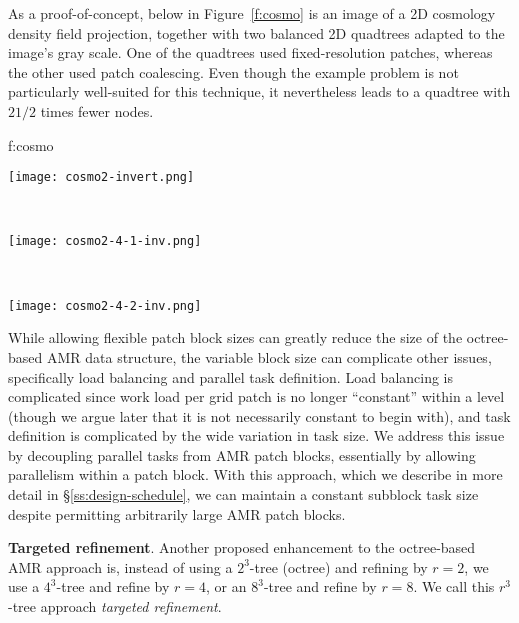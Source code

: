 \documentclass[10pt]{article}
\begin{document}
As a proof-of-concept, below in Figure~\ref{f:cosmo} is an image of a
2D cosmology density field projection, together with two balanced 2D
quadtrees adapted to the image's gray scale.  One of the quadtrees
used fixed-resolution patches, whereas the other used patch
coalescing.  Even though the example problem is not particularly
well-suited for this technique, it nevertheless leads to a quadtree
with $2 1/2$ times fewer nodes.

 {f:cosmo}{
\begin{minipage}{7.0in}
\begin{minipage}{2.2in}
\texttt{[image: cosmo2-invert.png]}
\end{minipage} \ 
\begin{minipage}{2.2in}
\texttt{[image: cosmo2-4-1-inv.png]}
\end{minipage} \ 
\begin{minipage}{2.2in}
\texttt{[image: cosmo2-4-2-inv.png]}
\end{minipage}
\end{minipage}
}

While allowing flexible patch block sizes can greatly reduce the size
of the octree-based AMR data structure, the variable block size can
complicate other issues, specifically load balancing and parallel task
definition.  Load balancing is complicated since work load per grid
patch is no longer ``constant'' within a level (though we argue later
that it is not necessarily constant to begin with), and task
definition is complicated by the wide variation in task size.  We
address this issue by decoupling parallel tasks from AMR patch blocks,
essentially by allowing parallelism within a patch block.  With this
approach, which we describe in more detail in
\S\ref{ss:design-schedule}, we can maintain a constant subblock task
size despite permitting arbitrarily large AMR patch blocks.



\textbf{Targeted refinement}.  Another proposed enhancement to the
octree-based AMR approach is, instead of using a $2^3$-tree (octree)
and refining by $r=2$, we use a $4^3$-tree and refine by $r=4$, or an
$8^3$-tree and refine by $r=8$.  We call this $r^3$-tree approach
\textit{targeted refinement}.
\end{document}
